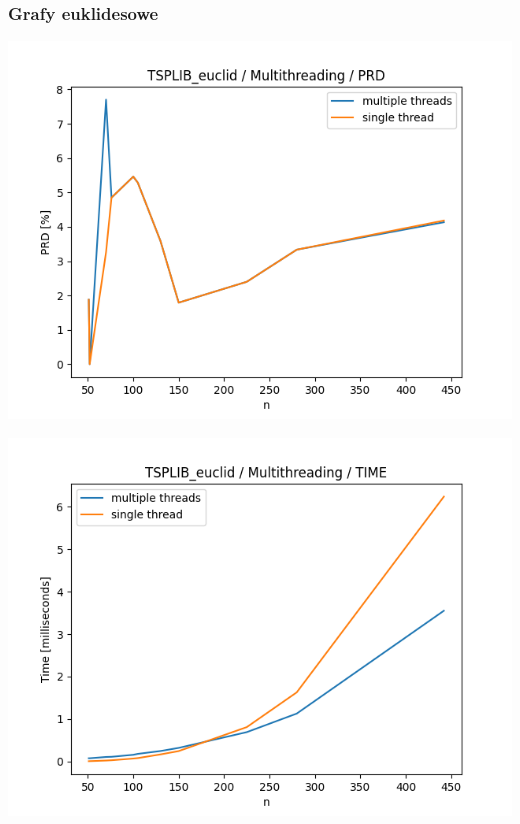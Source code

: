 \documentclass{article}
\begin{document}
\subsubsection{Grafy euklidesowe}

\begin{center}
\includegraphics[width=\textwidth, 
                   height = 0.4\textheight, 
                   keepaspectratio]
                  {plots/multithreading_tsplib_euclid_prd} 
\end{center}

\begin{center}
\includegraphics[width=\textwidth, 
                   height = 0.4\textheight, 
                   keepaspectratio]
                  {plots/multithreading_tsplib_euclid_time} 
\end{center}
\end{document}

